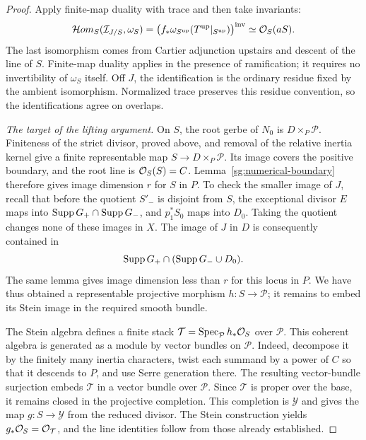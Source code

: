 \begin{proof}
Apply finite-map duality with trace and then take invariants:
\[
 \mathcal Hom_S(\mathcal I_{J/S},\omega_S)
 =
 \bigl(f_*\omega_{S^{\mathrm{up}}}
       (T^{\mathrm{up}}|_{S^{\mathrm{up}}})\bigr)^{\mathrm{inv}}
 \simeq\mathcal{O}_S(aS).
\]
The last isomorphism comes from Cartier adjunction upstairs
and descent of the line of $S$.  Finite-map duality applies
in the presence of ramification; it requires no invertibility
of $\omega_S$ itself.  Off $J$, the identification is the
ordinary residue fixed by the ambient isomorphism.  Normalized
trace preserves this residue convention, so the identifications
agree on overlaps.

\smallskip\noindent\emph{The target of the lifting argument.}
On $S$, the root gerbe of $N_0$ is $D\times_P\mathcal P$.
Finiteness of the strict divisor, proved above, and removal
of the relative inertia kernel give a finite representable
map $S\to D\times_P\mathcal P$.  Its image covers the positive
boundary, and the root line is $\mathcal{O}_S(S)=C$.
Lemma~\ref{sg:numerical-boundary} therefore gives image dimension
$r$ for $S$ in $P$. To check the smaller image of $J$, recall
that before the quotient $S'_-$ is disjoint from $S$, the
exceptional divisor $E$ maps into $\operatorname{Supp} G_+\cap\operatorname{Supp} G_-$,
and $p_1^*S_0$ maps into $D_0$. Taking the quotient changes none
of these images in $X$. The image of $J$ in $D$ is consequently
contained in
\[
 \operatorname{Supp} G_+\cap(\operatorname{Supp} G_-\cup D_0).
\]
The same lemma gives image dimension less than $r$ for this
locus in $P$. We have thus obtained a
representable projective morphism $h:S\to\mathcal P$; it remains
to embed its Stein image in the required smooth bundle.

The Stein algebra defines a finite stack
$\mathcal T=\operatorname{Spec}_{\mathcal P}h_*\mathcal{O}_S$ over $\mathcal P$.
This coherent algebra is generated as a module by vector
bundles on $\mathcal P$.  Indeed, decompose it by the finitely
many inertia characters, twist each summand by a power of $C$
so that it descends to $P$, and use Serre generation there.
The resulting vector-bundle surjection embeds $\mathcal T$ in
a vector bundle over $\mathcal P$.  Since $\mathcal T$ is
proper over the base, it remains closed in the projective
completion. This completion is $\mathcal Y$ and gives the map
$g:S\to\mathcal Y$ from the reduced divisor.
The Stein construction yields $g_*\mathcal{O}_S=\mathcal{O}_{\mathcal T}$,
and the line identities follow from those already established.


\end{proof}
